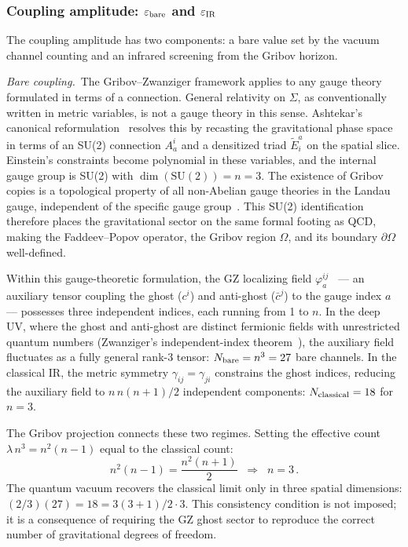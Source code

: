 \documentclass[a4paper,fleqn]{cas-dc}
\newcommand{\epsbare}{\varepsilon_{\rm bare}}
\newcommand{\epsIR}{\varepsilon_{\rm IR}}
\begin{document}
\subsubsection{Coupling amplitude: $\epsbare$ and $\epsIR$}
\label{sec:eps}

The coupling amplitude has two components: a bare value set by the
vacuum channel counting and an infrared screening from the Gribov
horizon.

\textit{Bare coupling.}~The Gribov--Zwanziger framework
applies to any gauge theory formulated in terms of a
connection. General relativity on $\Sigma$, as
conventionally written in metric variables, is not a
gauge theory in this sense. Ashtekar's canonical
reformulation~\cite{ashtekar1986} resolves this by
recasting the gravitational phase space in terms of an
SU(2) connection $A_a^i$ and a densitized triad
$\tilde{E}^a_i$ on the spatial slice. Einstein's
constraints become polynomial in these variables, and
the internal gauge group is SU(2) with
$\dim(\mathrm{SU}(2)) = n = 3$. The existence of Gribov
copies is a topological property of all non-Abelian gauge
theories in the Landau gauge, independent of the specific
gauge group~\cite{vandersickel2012}. This SU(2)
identification therefore places the gravitational sector
on the same formal footing as QCD, making the
Faddeev--Popov operator, the Gribov region $\Omega$, and
its boundary $\partial\Omega$ well-defined.

Within this gauge-theoretic formulation, the GZ
localizing field
$\varphi_a^{ij}$~\cite{zwanziger1989} --- an auxiliary
tensor coupling the ghost ($c^i$) and anti-ghost
($\bar{c}^j$) to the gauge index $a$ --- possesses three
independent indices, each running from 1 to $n$. In the
deep UV, where the ghost and anti-ghost are distinct
fermionic fields with unrestricted quantum numbers
(Zwanziger's independent-index
theorem~\cite{zwanziger1989}), the auxiliary field
fluctuates as a fully general rank-3 tensor:
$N_{\rm bare} = n^3 = 27$ bare channels. In the
classical IR, the metric symmetry
$\gamma_{ij} = \gamma_{ji}$ constrains the ghost
indices, reducing the auxiliary field to
$n\,n(n{+}1)/2$ independent components:
$N_{\rm classical} = 18$ for $n = 3$.

The Gribov projection connects these two regimes.
Setting the effective count
$\lambda\, n^3 = n^2(n{-}1)$ equal to the
classical count:
\begin{equation}
n^2(n{-}1) = \frac{n^2(n{+}1)}{2}
\;\;\Longrightarrow\;\;
\boxed{n = 3\,.}
\label{eq:n3}
\end{equation}
The quantum vacuum recovers the classical limit only in
three spatial dimensions: $(2/3)(27) = 18
= 3(3{+}1)/2 \cdot 3$. This consistency
condition is not imposed; it is a consequence of
requiring the GZ ghost sector to reproduce the correct
number of gravitational degrees of freedom.
\end{document}
